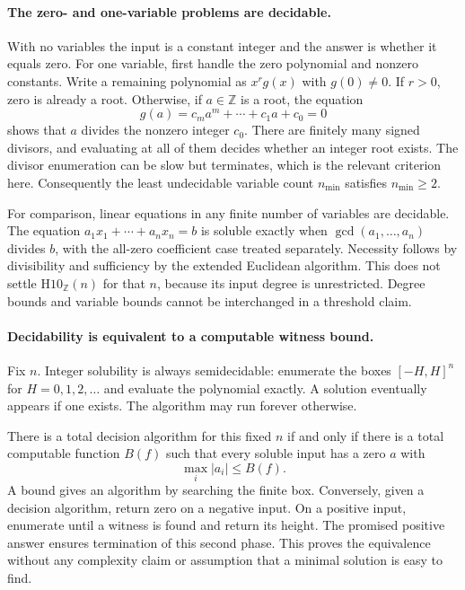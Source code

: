 \documentclass[11pt]{article}
\begin{document}
\paragraph{The zero- and one-variable problems are decidable.}
With no variables the input is a constant integer and the answer is
whether it equals zero. For one variable, first handle the zero
polynomial and nonzero constants. Write a remaining polynomial as
$x^r g(x)$ with $g(0)\ne0$. If $r>0$, zero is already a root.
Otherwise, if $a\in\mathbb Z$ is a root, the equation
\[
 g(a)=c_m a^m+\cdots+c_1a+c_0=0
\]
shows that $a$ divides the nonzero integer $c_0$. There are finitely
many signed divisors, and evaluating at all of them decides whether
an integer root exists. The divisor enumeration can be slow but
terminates, which is the relevant criterion here. Consequently the
least undecidable variable count $n_{\min}$ satisfies $n_{\min}\ge2$.

For comparison, linear equations in any finite number of variables
are decidable. The equation $a_1x_1+\cdots+a_nx_n=b$ is soluble
exactly when $\gcd(a_1,\ldots,a_n)$ divides $b$, with the all-zero
coefficient case treated separately. Necessity follows by divisibility
and sufficiency by the extended Euclidean algorithm. This does not
settle $\mathrm{H10}_{\mathbb Z}(n)$ for that $n$, because its input
degree is unrestricted. Degree bounds and variable bounds cannot be
interchanged in a threshold claim.

\paragraph{Decidability is equivalent to a computable witness bound.}
Fix $n$. Integer solubility is always semidecidable: enumerate the
boxes $[-H,H]^n$ for $H=0,1,2,\ldots$ and evaluate the polynomial
exactly. A solution eventually appears if one exists. The algorithm
may run forever otherwise.

There is a total decision algorithm for this fixed $n$ if and only if
there is a total computable function $B(f)$ such that every soluble
input has a zero $a$ with
\[
 \max_i|a_i|\le B(f).                                 \tag{1}
\]
A bound gives an algorithm by searching the finite box. Conversely,
given a decision algorithm, return zero on a negative input. On a
positive input, enumerate until a witness is found and return its
height. The promised positive answer ensures termination of this
second phase. This proves the equivalence without any complexity
claim or assumption that a minimal solution is easy to find.
\end{document}

